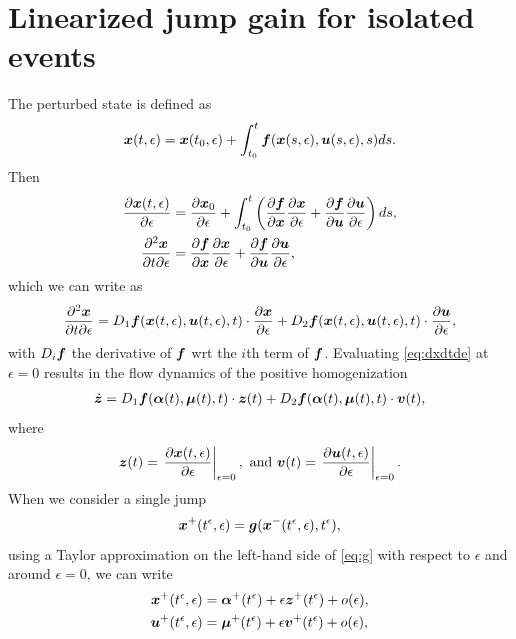 \documentclass[../DC2017114Bouma.tex]{subfiles}
\begin{document}
\section{Linearized jump gain for isolated events}
The perturbed state is defined as
\begin{align}
{\boldsymbol{x}}(t,\epsilon) = {\boldsymbol{x}}(t_0,\epsilon) + \int_{t_0}^{t}{\boldsymbol{f}}({\boldsymbol{x}}(s,\epsilon),{\boldsymbol{u}}(s,\epsilon),s)ds.
\end{align}
Then
\begin{align}
\frac{\partial{\boldsymbol{x}}(t,\epsilon)}{\partial\epsilon} &= \frac{\partial{\boldsymbol{x}}_0}{\partial\epsilon} + \int_{t_0}^{t}\left(\frac{\partial{\boldsymbol{f}}}{\partial{\boldsymbol{x}}}\frac{\partial{\boldsymbol{x}}}{\partial\epsilon} + \frac{\partial{\boldsymbol{f}}}{\partial{\boldsymbol{u}}}\frac{\partial{\boldsymbol{u}}}{\partial\epsilon}\right)ds,\\
\frac{\partial^2{\boldsymbol{x}}}{\partial t\partial\epsilon} &= \frac{\partial{\boldsymbol{f}}}{\partial{\boldsymbol{x}}}\frac{\partial{\boldsymbol{x}}}{\partial\epsilon} + \frac{\partial{\boldsymbol{f}}}{\partial{\boldsymbol{u}}}\frac{\partial{\boldsymbol{u}}}{\partial\epsilon},
\end{align}
which we can write as
\begin{align}
\frac{\partial^2{\boldsymbol{x}}}{\partial t\partial\epsilon} = D_1{\boldsymbol{f}}({\boldsymbol{x}}(t,\epsilon),{\boldsymbol{u}}(t,\epsilon),t)\cdot \frac{\partial{\boldsymbol{x}}}{\partial\epsilon} + D_2{\boldsymbol{f}}({\boldsymbol{x}}(t,\epsilon),{\boldsymbol{u}}(t,\epsilon),t)\cdot \frac{\partial{\boldsymbol{u}}}{\partial\epsilon}, \label{eq:dxdtde}
\end{align}
with $D_i{\boldsymbol{f}}$ the derivative of ${\boldsymbol{f}}$ wrt the $i$th term of ${\boldsymbol{f}}$. Evaluating \eqref{eq:dxdtde} at $\epsilon = 0$ results in the flow dynamics of the positive homogenization
\begin{align}
\dot{{\boldsymbol{z}}} = D_1{\boldsymbol{f}}(\boldsymbol{\alpha}(t),\boldsymbol{\mu}(t),t)\cdot {\boldsymbol{z}}(t) + D_2{\boldsymbol{f}}(\boldsymbol{\alpha}(t),\boldsymbol{\mu}(t),t)\cdot {\boldsymbol{v}}(t),
\end{align}
where 
\begin{align}
{\boldsymbol{z}}(t) = \left.\frac{\partial{\boldsymbol{x}}(t,\epsilon)}{\partial\epsilon}\right|_{\epsilon=0},\text{ and } {\boldsymbol{v}}(t) = \left.\frac{\partial{\boldsymbol{u}}(t,\epsilon)}{\partial\epsilon}\right|_{\epsilon=0} .
\end{align}
When we consider a single jump
\begin{align}
{\boldsymbol{x}}^{+}(t^\epsilon,\epsilon) = {\boldsymbol{g}}({\boldsymbol{x}}^{-}(t^\epsilon,\epsilon),t^\epsilon),\label{eq:g}
\end{align}
using a Taylor approximation on the left-hand side of \eqref{eq:g} with respect to $\epsilon$ and around $\epsilon = 0$, we can write
\begin{align}
{\boldsymbol{x}}^{+}(t^\epsilon,\epsilon) &= \boldsymbol{\alpha}^{+}(t^\epsilon) + \epsilon {\boldsymbol{z}}^{+}(t^\epsilon) + o(\epsilon),\label{eq:xe}\\
{\boldsymbol{u}}^{+}(t^\epsilon,\epsilon) &= \boldsymbol{\mu}^{+}(t^\epsilon) + \epsilon {\boldsymbol{v}}^{+}(t^\epsilon) + o(\epsilon),\label{eq:ue}
\end{align}
\end{document}
